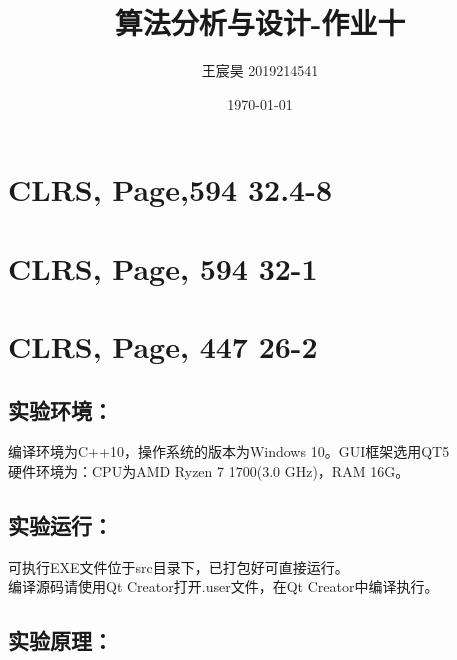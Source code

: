\documentclass[UTF8]{ctexart}
\title{算法分析与设计-作业十}
\author{王宸昊 2019214541}
\date{\today}
\begin{document}
\maketitle


\section{CLRS, Page,594 32.4-8}





\section{CLRS, Page, 594 32-1}




\section{CLRS, Page, 447 26-2}

\subsection{实验环境：}

编译环境为C++10，操作系统的版本为Windows 10。GUI框架选用QT5\\
硬件环境为：CPU为AMD Ryzen 7 1700(3.0 GHz)，RAM 16G。\\

\subsection{实验运行：}

可执行EXE文件位于src目录下，已打包好可直接运行。\\

编译源码请使用Qt Creator打开.user文件，在Qt Creator中编译执行。

\subsection{实验原理：}
\end{document}
